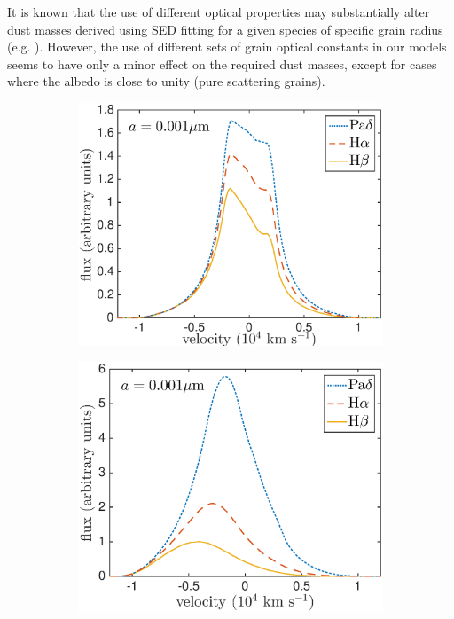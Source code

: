 It is known that the use of different optical properties may substantially 
alter dust masses derived using SED fitting for a given species of 
specific grain radius (e.g. \citet{Owen2015}).  However, the use of 
different sets of grain optical constants in our models seems to have only 
a minor effect on the required dust masses, except for cases where the 
albedo is close to unity (pure scattering grains).

\begin{figure}
\begin{subfigure}{0.5\textwidth}
\includegraphics[trim =10 23 25 0,clip=true,scale=0.42]{chapters/chapter4/images/dustdep/a0_001_opt_thin_HaHbPad}
\end{subfigure}
\hspace{4.5mm}
\begin{subfigure}{0.5\textwidth}
\includegraphics[trim =49 29 25 0,clip=true,scale=0.42]{chapters/chapter4/images/dustdep/a0_001_opt_thick_HaHbPad}
\end{subfigure} \\[1ex]


\end{figure}
